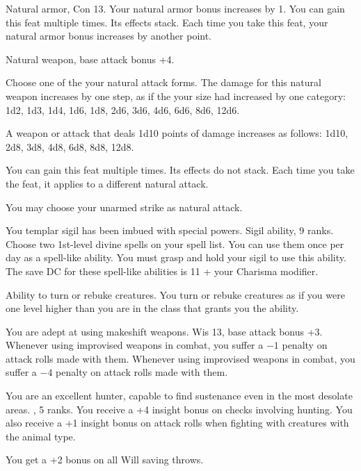 {}
{Natural armor, Con 13.}
{Your natural armor bonus increases by 1.}
{}
{You can gain this feat multiple times. Its effects stack. Each time you take this feat, your natural armor bonus increases by another point.}

{}
{Natural weapon, base attack bonus +4.}
{Choose one of the your natural attack forms. The damage for this natural weapon increases by one step, as if the your size had increased by one category: 1d2, 1d3, 1d4, 1d6, 1d8, 2d6, 3d6, 4d6, 6d6, 8d6, 12d6.

A weapon or attack that deals 1d10 points of damage increases as follows: 1d10, 2d8, 3d8, 4d8, 6d8, 8d8, 12d8.}
{}
{You can gain this feat multiple times. Its effects do not stack. Each time you take the feat, it applies to a different natural attack.

You may choose your unarmed strike as natural attack.}

{You templar sigil has been imbued with special powers.}
{Sigil ability,  9 ranks.}
{Choose two 1st-level divine spells on your spell list. You can use them once per day as a spell-like ability. You must grasp and hold your sigil to use this ability. The save DC for these spell-like abilities is 11 + your Charisma modifier.}{}{}

{Ability to turn or rebuke creatures.}
{You turn or rebuke creatures as if you were one level higher than you are in the class that grants you the ability.}

{You are adept at using makeshift weapons.}
{Wis 13, base attack bonus +3.}
{Whenever using improvised weapons in combat, you suffer a $-1$ penalty on attack rolls made with them.}
{Whenever using improvised weapons in combat, you suffer a $-4$ penalty on attack rolls made with them.}{}

{You are an excellent hunter, capable to find sustenance even in the most desolate areas.}
{,  5 ranks.}
{You receive a +4 insight bonus on  checks involving hunting. You also receive a +1 insight bonus on attack rolls when fighting with creatures with the animal type.}{}{}

{You get a +2 bonus on all Will saving throws.}


